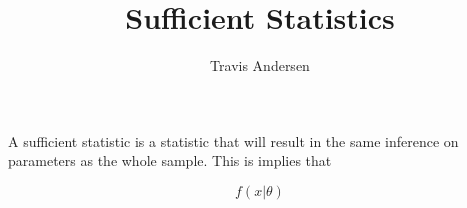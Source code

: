 \documentclass{article}
\title{Sufficient Statistics}
\author{Travis Andersen}
\begin{document}
\maketitle

A sufficient statistic is a statistic that will result in the same inference on parameters as the whole sample. This is implies that 

\begin{equation*}
  f(x|\theta)
\end{equation*}
\end{document}
